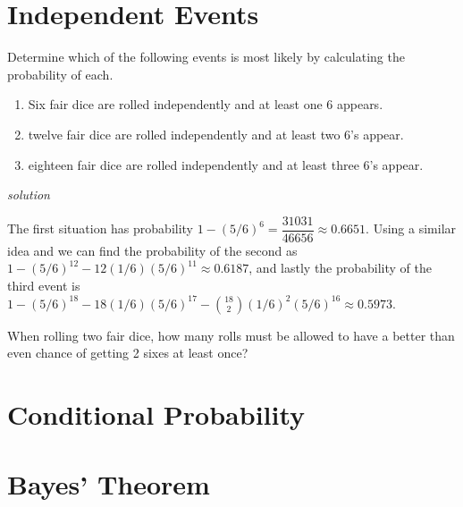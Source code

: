 \documentclass{amsbook}
\begin{document}
\section{Independent Events}

\begin{Exercise}[title={Newton talks with Pepys}, difficulty=2, label=ie1]
    Determine which of the following events is most likely by calculating the probability of each.
        \begin{enumerate}
            \item Six fair dice are rolled independently and at least one 6 appears.
            \item twelve fair dice are rolled independently and at least two 6's appear.
            \item eighteen fair dice are rolled independently and at least three 6's appear.
        \end{enumerate}

        \hfill \emph{solution} 
\end{Exercise}

\begin{Answer}[ref={ie1}]
    The first situation has probability $1-(5/6)^6=\dfrac{31031}{46656}\approx 0.6651$. Using a similar idea and we can find the probability of the second as $1-(5/6)^{12}-12(1/6)(5/6)^{11} \approx 0.6187$, and lastly the probability of the third event is $1-(5/6)^{18}-18(1/6)(5/6)^{17}-{18 \choose 2}(1/6)^2(5/6)^{16} \approx 0.5973$.
\end{Answer}

\begin{Exercise}[title={Pascal's Problem}, difficulty=2, label=ie2]
    When rolling two fair dice, how many rolls must be allowed to have a better than even chance of getting 2 sixes at least once?
\end{Exercise}

\begin{Answer}[ref={ie2}]
    
\end{Answer}


\section{Conditional Probability}

\section{Bayes' Theorem}
\end{document}
